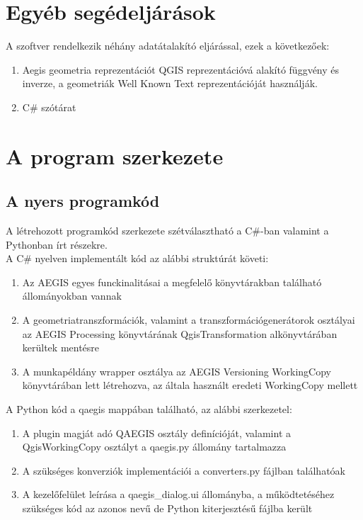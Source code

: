 \section{Egyéb segédeljárások} 
A szoftver rendelkezik néhány adatátalakító eljárással, ezek a következőek:
\begin{enumerate}
	\item Aegis geometria reprezentációt QGIS reprezentációvá alakító függvény és inverze, a geometriák Well Known Text reprezentációját használják.
	\item C\# szótárat 
\end{enumerate}

\section{A program szerkezete} 
\subsection{A nyers programkód}
A létrehozott programkód szerkezete szétválasztható a C\#-ban valamint a Pythonban írt részekre.\\
A C\# nyelven implementált kód az alábbi struktúrát követi:
\begin{enumerate}
	\item Az AEGIS egyes funckinalitásai a megfelelő könyvtárakban található állományokban vannak
	\item A geometriatranszformációk, valamint a transzformációgenerátorok osztályai az AEGIS Processing könyvtárának QgisTransformation alkönyvtárában kerültek mentésre
	\item A munkapéldány wrapper osztálya az AEGIS Versioning WorkingCopy könyvtárában lett létrehozva, az általa használt eredeti WorkingCopy mellett 
\end{enumerate}
A Python kód a qaegis mappában található, az alábbi szerkezetel:
\begin{enumerate}
	\item A plugin magját adó QAEGIS osztály definícióját, valamint a QgisWorkingCopy osztályt a qaegis.py állomány tartalmazza
	\item A szükséges konverziók implementációi a converters.py fájlban találhatóak
	\item A kezelőfelület leírása a qaegis\_dialog.ui állományba, a működtetéséhez szükséges kód az azonos nevű de Python kiterjesztésű fájlba került
\end{enumerate}
